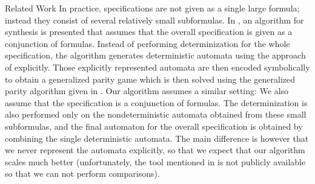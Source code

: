 \documentclass[copyright,creativecommons]{eptcs}
\begin{document}
\begin{section}{Related Work}
In practice, specifications are not given as a single large formula; instead they consist of several relatively small subformulas. In \cite{SoSR08}, an algorithm for  synthesis is presented that assumes that the overall specification is given as a conjunction of  formulas. Instead of performing determinization for the whole specification, the algorithm generates deterministic automata using the approach of \cite{Pite06} explicitly. Those explicitly represented automata are then encoded symbolically to obtain a generalized parity game which is then solved using the generalized parity algorithm given in \cite{ChHP07a}. Our algorithm assumes a similar setting: We also assume that the specification is a conjunction of  formulas. The determinization is also performed only on the nondeterministic automata obtained from these small subformulas, and the final automaton for the overall specification is obtained by combining the single deterministic automata. The main difference is however that we never represent the automata explicitly, so that we expect that our algorithm scales much better (unfortunately, the tool mentioned in \cite{SoSR08} is not publicly available so that we can not perform comparisons).
\end{section}
\end{document}
